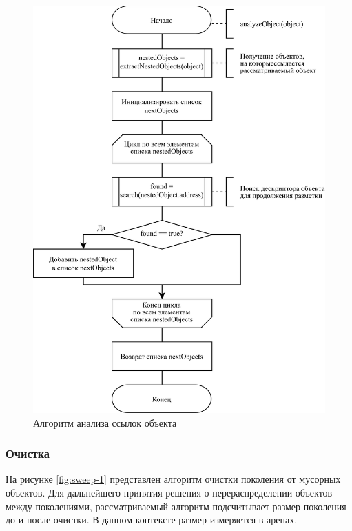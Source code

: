 \begin{figure}[H]
	\centering
	\includegraphics[scale=0.185]{assets/mark-5.png}
	\caption{Алгоритм анализа ссылок объекта}
	\label{fig:mark-5}
\end{figure}

\subsubsection{Очистка}

На рисунке \ref{fig:sweep-1} представлен алгоритм очистки поколения от мусорных объектов. Для дальнейшего принятия решения о перераспределении объектов между поколениями, рассматриваемый алгоритм подсчитывает размер поколения до и после очистки. В данном контексте размер измеряется в аренах.


